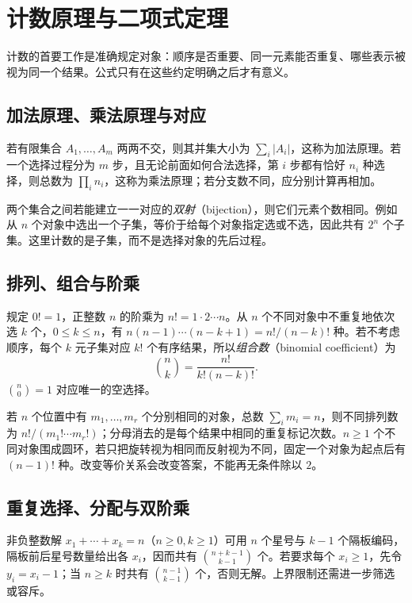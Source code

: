 \setcounter{chapter}{10} %
\chapter{计数原理与二项式定理}
\label{chap:em-counting}
计数的首要工作是准确规定对象：顺序是否重要、同一元素能否重复、哪些表示被视为同一个结果。公式只有在这些约定明确之后才有意义。

\section{加法原理、乘法原理与对应}
若有限集合 $A_1,\ldots,A_m$ 两两不交，则其并集大小为 $\sum_i|A_i|$，这称为加法原理。若一个选择过程分为 $m$ 步，且无论前面如何合法选择，第 $i$ 步都有恰好 $n_i$ 种选择，则总数为 $\prod_i n_i$，这称为乘法原理；若分支数不同，应分别计算再相加。

两个集合之间若能建立一一对应的\emph{双射}（bijection），则它们元素个数相同。例如从 $n$ 个对象中选出一个子集，等价于给每个对象指定选或不选，因此共有 $2^n$ 个子集。这里计数的是子集，而不是选择对象的先后过程。

\section{排列、组合与阶乘}
规定 $0!=1$，正整数 $n$ 的阶乘为 $n!=1\cdot2\cdots n$。从 $n$ 个不同对象中不重复地依次选 $k$ 个，$0\le k\le n$，有 $n(n-1)\cdots(n-k+1)=n!/(n-k)!$ 种。若不考虑顺序，每个 $k$ 元子集对应 $k!$ 个有序结果，所以\emph{组合数}（binomial coefficient）为
\[
 \binom nk=\frac{n!}{k!(n-k)!}.
\]
$\binom n0=1$ 对应唯一的空选择。

若 $n$ 个位置中有 $m_1,\ldots,m_r$ 个分别相同的对象，总数 $\sum_i m_i=n$，则不同排列数为 $n!/(m_1!\cdots m_r!)$；分母消去的是每个结果中相同的重复标记次数。$n\ge1$ 个不同对象围成圆环，若只把旋转视为相同而反射视为不同，固定一个对象为起点后有 $(n-1)!$ 种。改变等价关系会改变答案，不能再无条件除以 $2$。

\section{重复选择、分配与双阶乘}
非负整数解 $x_1+\cdots+x_k=n$（$n\ge0,k\ge1$）可用 $n$ 个星号与 $k-1$ 个隔板编码，隔板前后星号数量给出各 $x_i$，因而共有 $\binom{n+k-1}{k-1}$ 个。若要求每个 $x_i\ge1$，先令 $y_i=x_i-1$；当 $n\ge k$ 时共有 $\binom{n-1}{k-1}$ 个，否则无解。上界限制还需进一步筛选或容斥。

